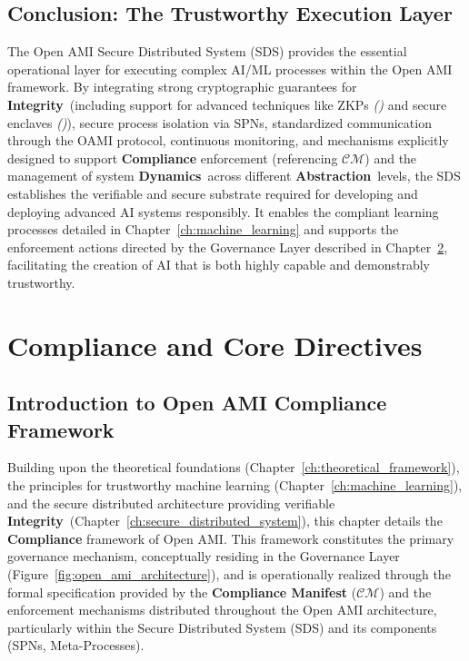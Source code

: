 \documentclass[12pt,a4paper]{report}
\renewcommand{\citep}[1]{\textit{\scriptsize{(\cite{#1})}}}
\newcommand{\Integrity}{\textbf{Integrity}}
\newcommand{\Abstraction}{\textbf{Abstraction}}
\newcommand{\Dynamics}{\textbf{Dynamics}}
\begin{document}
	\section{Conclusion: The Trustworthy Execution Layer} %
	\label{sec:4-8} %
	
	The Open AMI Secure Distributed System (SDS) provides the essential operational layer for executing complex AI/ML processes within the Open AMI framework. By integrating strong cryptographic guarantees for \Integrity\ (including support for advanced techniques like ZKPs \citep{Peng2025ZKMLSurvey} and secure enclaves \citep{Citadel_PlusPlus_2025}), secure process isolation via SPNs, standardized communication through the OAMI protocol, continuous monitoring, and mechanisms explicitly designed to support \textbf{Compliance} enforcement (referencing $\mathcal{CM}$) and the management of system \Dynamics\ across different \Abstraction\ levels, the SDS establishes the verifiable and secure substrate required for developing and deploying advanced AI systems responsibly. It enables the compliant learning processes detailed in Chapter~\ref{ch:machine_learning} and supports the enforcement actions directed by the Governance Layer described in Chapter~\ref{ch:compliance}, facilitating the creation of AI that is both highly capable and demonstrably trustworthy.
	
		\chapter{Compliance and Core Directives} %
	\label{ch:compliance}
	
	\section{Introduction to Open AMI Compliance Framework} %
	\label{sec:5-1} %
	
	Building upon the theoretical foundations (Chapter~\ref{ch:theoretical_framework}), the principles for trustworthy machine learning (Chapter~\ref{ch:machine_learning}), and the secure distributed architecture providing verifiable \Integrity\ (Chapter~\ref{ch:secure_distributed_system}), this chapter details the \textbf{Compliance} framework of Open AMI. This framework constitutes the primary governance mechanism, conceptually residing in the Governance Layer (Figure~\ref{fig:open_ami_architecture}), and is operationally realized through the formal specification provided by the \textbf{Compliance Manifest} ($\mathcal{CM}$) and the enforcement mechanisms distributed throughout the Open AMI architecture, particularly within the Secure Distributed System (SDS) and its components (SPNs, Meta-Processes).
	
\end{document}
